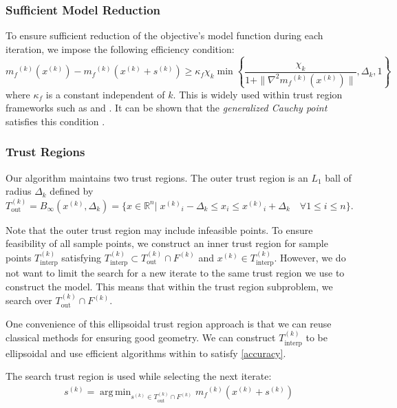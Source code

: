 \documentclass{article}
\theoremstyle{case}
\newcommand{\modelk}{{{m}_f}^{(k)}}
\newcommand{\iteratek}{{x}^{(k)}}
\newcommand{\trialk}{{{s}^{(k)}}}
\newcommand{\outertrk}{{T_{\text{out}}^{(k)}}}
\newcommand{\sampletrk}{{T_{\text{interp}}^{(k)}}}
\newcommand{\feasiblek}{{F}^{(k)}}
\newcommand{\dk}{\Delta_k}
\DeclareMathOperator*{\argmin}{arg\,min}
\begin{document}
\subsubsection{Sufficient Model Reduction}

To ensure sufficient reduction of the objective's model function during each iteration, we impose the following efficiency condition:
\begin{equation}
\label{efficiency}
\modelk(\iteratek) - \modelk(\iteratek + \trialk) \ge \kappa_f \chi_k \min\left\{ \frac{\chi_k}{1+\|\nabla^2 \modelk(\iteratek)\|}, \dk, 1 \right\}
\end{equation}
where $\kappa_f$ is a constant independent of $k$.
This is widely used within trust region frameworks such as \cite{Conejo:2013:GCT:2620806.2621814} and \cite{Conn:2000:TM:357813}.
It can be shown that the \emph{generalized Cauchy point} satisfies this condition \cite{Conn:2000:TM:357813}.


\subsubsection{Trust Regions}
Our algorithm maintains two trust regions.
The outer trust region is an $L_1$ ball of radius $ \dk $ defined by
\begin{equation}
\label{trust_region}
\outertrk = B_{\infty}(\iteratek,\dk) = \{x\in \mathbb R^n | \; {\iteratek}_i - \dk \le x_i \le {\iteratek}_i + \dk \quad \forall 1\le i \le n\}.
\end{equation}

Note that the outer trust region may include infeasible points.
To ensure feasibility of all sample points, we construct an inner trust region for sample points $ \sampletrk $  satisfying 
$\sampletrk \subset \outertrk \cap \feasiblek$ and $\iteratek \in \sampletrk $.
However, we do not want to limit the search for a new iterate to the same trust region we use to construct the model.
This means that within the trust region subproblem, we search over $\outertrk \cap \feasiblek$.

One convenience of this ellipsoidal trust region approach is that we can reuse classical methods for ensuring good geometry.
We can construct $\sampletrk$ to be ellipsoidal and use efficient algorithms within \cite{DUMMY:intro_book} to satisfy \cref{accuracy}.

The search trust region is used while selecting the next iterate:
\begin{align*}
\trialk = \argmin_{\trialk \in \outertrk \cap \feasiblek} \modelk(\iteratek + \trialk)
\end{align*}
\end{document}
